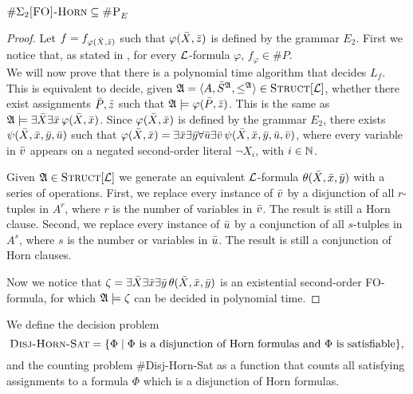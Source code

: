 \begin{theo}
	$\#\Sigma_2\textsc{[FO]-Horn} \subseteq \textsc{\#P}_E$
\end{theo} 
\begin{proof}
	Let $f = f_{\varphi(\bar{X},\bar{z})}$ such that $\varphi(\bar{X},\bar{z})$ is defined by the grammar $E_2$. First we notice that, as stated in \cite{DBLP:journals/jcss/SalujaST95}, for every ${\cal L}$-formula $\varphi$, $f_{\varphi}\in\#P$.\\
	
	We will now prove that there is a polynomial time algorithm that decides $L_{f}$. This is equivalent to decide, given ${\frak A}= \langle A, \bar{S}^{\frak A}, \leq^{\frak A} \rangle\in\textsc{Struct}[{\cal L}]$, whether there exist assignments $\bar{P},\bar{z}$ such that ${\frak A}\models\varphi(\bar{P},\bar{z})$. This is the same as ${\frak A}\models\exists\bar{X}\exists\bar{x}\,\varphi(\bar{X},\bar{x})$. Since $\varphi(\bar{X},\bar{x})$ is defined by the grammar $E_2$, there exists $\psi(\bar{X},\bar{x},\bar{y},\bar{u})$ such that $\varphi(\bar{X},\bar{x}) = \exists\bar{x}\exists\bar{y}\forall\bar{u}\exists\bar{v}\,\psi(\bar{X},\bar{x},\bar{y},\bar{u},\bar{v})$, where every variable in $\bar{v}$ appears on a negated second-order literal $\neg X_i$, with $i\in\mathbb{N}$.
	
	Given ${\frak A}\in\textsc{Struct}[{\cal L}]$ we generate an equivalent ${\cal L}$-formula $\theta(\bar{X},\bar{x},\bar{y})$ with a series of operations. First, we replace every instance of $\bar{v}$ by a disjunction of all $r$-tuples in $A^r$, where $r$ is the number of variables in $\bar{v}$. The result is still a Horn clause. Second, we replace every instance of $\bar{u}$ by a conjunction of all $s$-tulples in $A^s$, where $s$ is the number or variables in $\bar{u}$. The result is still a conjunction of Horn clauses.
	
	Now we notice that $\zeta = \exists\bar{X}\exists\bar{x}\exists\bar{y}\,\theta(\bar{X},\bar{x},\bar{y})$ is an existential second-order FO-formula, for which ${\frak A}\models\zeta$ can be decided in polynomial time.
\end{proof}

We define the decision problem
\[
\textsc{Disj-Horn-Sat} = \{\Phi \mid \Phi \mbox{ is a disjunction of Horn formulas and $\Phi$ is satisfiable}\},
\]
and the counting problem {\sc \#Disj-Horn-Sat} as a function that counts all satisfying assignments to a formula $\Phi$ which is a disjunction of Horn formulas.

